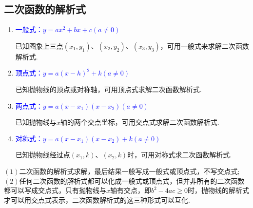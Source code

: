 \documentclass[10pt]{ctexart}
\begin{document}
\subsection{二次函数的解析式}
\begin{enumerate}
\item \textcolor{blue}{一般式：$y=ax^2+bx+c(a\neq 0)$}

已知图象上三点$(x_1,y_1)$、$(x_2,y_2)$、$(x_3,y_3)$，可用一般式来求解二次函数解析式.
\item \textcolor{blue}{顶点式：$y=a(x-h)^2+k(a\neq 0)$}

已知抛物线的顶点或对称轴，可用顶点式求解二次函数解析式.
\item \textcolor{blue}{两点式：$y=a(x-x_1)(x-x_2)(a\neq 0)$}

已知抛物线与$x$轴的两个交点坐标，可用交点式求解二次函数解析式.
\item \textcolor{blue}{对称式：$y=a(x-x_1)(x-x_2)+k(a\neq 0)$}

已知抛物线经过点$(x_1,k)$、$(x_2,k)$时，可用对称式求二次函数解析式.
\end{enumerate}
\begin{vuyi}\par
    $(1)$二次函数的解析式求解，最后结果一般写成一般式或顶点式，不写交点式;\\
    $(2)$任何二次函数的解析式都可以化成一般式或顶点式，但并非所有的二次函数都可以写成交点式，只有抛物线与$x$轴有交点，即$b^2-4ac\geqslant 0$时，抛物线的解析式才可以用交点式表示，二次函数解析式的这三种形式可以互化.
\end{vuyi}
\end{document}
